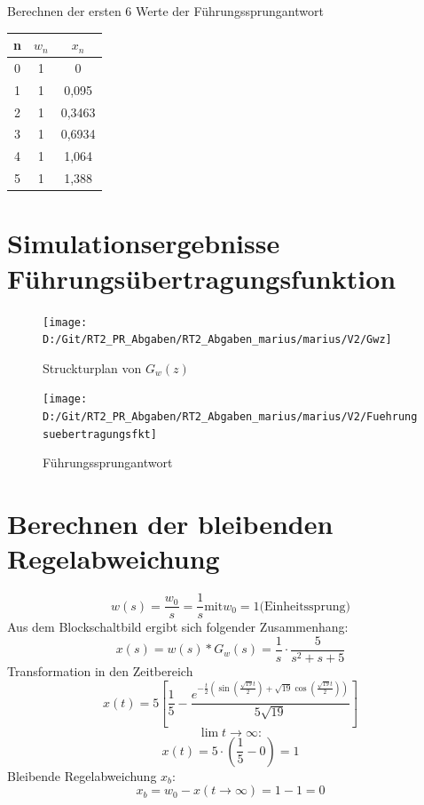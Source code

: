 \documentclass[12pt,a4paper]{article}
\begin{document}
	Berechnen der ersten 6 Werte der Führungssprungantwort\\
		\begin{tabular}{c|c|c}
			n & $w_n$&$x_n$ \\ \hline
			0&1&0  \\ \hline
			1&1&0,095  \\ \hline
			2&1&0,3463  \\ \hline	
			3&1&0,6934  \\ \hline
			4&1&1,064  \\ \hline
			5&1&1,388  \\ 
		\end{tabular}
\newpage
\section{Simulationsergebnisse Führungsübertragungsfunktion}
\begin{figure}[h!]
	\centering
	\texttt{[image: D:/Git/RT2\_PR\_Abgaben/RT2\_Abgaben\_marius/marius/V2/Gwz]}
	\caption{Struckturplan von $G_w(z)$}
	\label{fig:gwz}
\end{figure}
\begin{figure}[h!]
\centering
\texttt{[image: D:/Git/RT2\_PR\_Abgaben/RT2\_Abgaben\_marius/marius/V2/Fuehrungsuebertragungsfkt]}
\caption{Führungssprungantwort}
\label{fig:fuehrungsuebertragungsfkt}
\end{figure}
\newpage
\section{Berechnen der bleibenden Regelabweichung}
\begin{equation}
w(s)= \frac{w_0}{s} = \frac{1}{s} \text{mit} w_0 = 1 \text{(Einheitssprung)}
\end{equation}
Aus dem Blockschaltbild ergibt sich folgender Zusammenhang:
\begin{equation}
x(s) = w(s)*G_w(s) = \frac{1}{s}\cdot \frac{5}{s^2+s+5}
\end{equation}
Transformation in den Zeitbereich
\begin{equation}
x(t) = 5\left[
\frac{1}{5}-
\frac
	{e^{-\frac{t}{2}(\sin(\frac{\sqrt{19}t}{2})+\sqrt{19}\cos(\frac{\sqrt{19}t}{2}))}}
{5\sqrt{19}}
\right]
\end{equation}
\begin{equation}
\lim t\rightarrow \infty:
\end{equation}
\begin{equation}
x(t) = 5\cdot \left( \frac{1}{5}-0\right) =1
\end{equation}
Bleibende Regelabweichung $x_b$:
\begin{equation}\label{key}
x_b = w_0 -x(t\rightarrow \infty) = 1-1=0
\end{equation}
\end{document}
